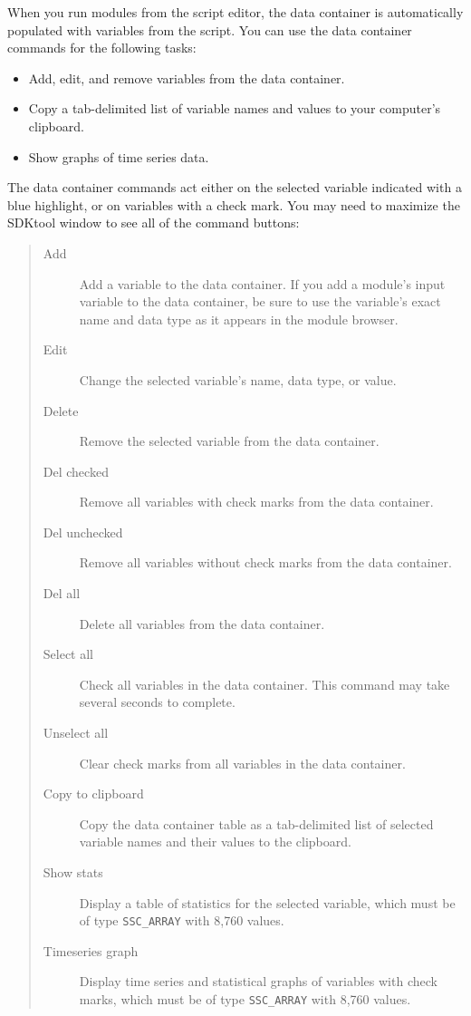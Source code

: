 \documentclass{scrartcl} %
\begin{document}
When you run modules from the script editor, the data container is automatically populated with variables from the script. You can use the data container commands for the following tasks:

\begin{itemize}
\item Add, edit, and remove variables from the data container.
\item Copy a tab-delimited list of variable names and values to your computer's clipboard.
\item Show graphs of time series data.
\end{itemize}

The data container commands act either on the selected variable indicated with a blue highlight, or on variables with a check mark. You may need to maximize the SDKtool window to see all of the command buttons:

\begin{quote}
\begin{description}
\item[Add] Add a variable to the data container. If you add a module's input variable to the data container, be sure to use the variable's exact name and data type as it appears in the module browser.
\item[Edit] Change the selected variable's name, data type, or value.
\item[Delete] Remove the selected variable from the data container.
\item[Del checked] Remove all variables with check marks from the data container.
\item[Del unchecked] Remove all variables without check marks from the data container.
\item[Del all] Delete all variables from the data container.
\item[Select all]  Check all variables in the data container. This command may take several seconds to complete.
\item[Unselect all] Clear check marks from all variables in the data container.
\item[Copy to clipboard] Copy the data container table as a tab-delimited list of selected variable names and their values to the clipboard.
\item[Show stats] Display a table of statistics for the selected variable, which must be of type \texttt{SSC\_ARRAY} with 8,760 values.
\item[Timeseries graph] Display time series and statistical graphs of variables with check marks, which must be of type \texttt{SSC\_ARRAY} with 8,760 values.
\end{description}
\end{quote}
\end{document}
